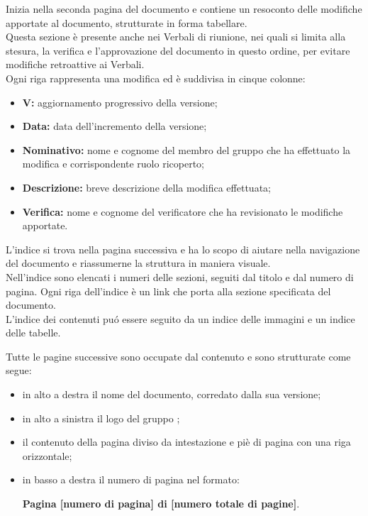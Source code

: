         Inizia nella seconda pagina del documento e contiene un resoconto delle modifiche apportate al documento, strutturate in forma tabellare.\\
        Questa sezione è presente anche nei Verbali di riunione, nei quali si limita alla stesura, la verifica e l'approvazione del documento in questo ordine, per evitare modifiche retroattive ai Verbali.\\
        Ogni riga rappresenta una modifica ed è suddivisa in cinque colonne:
        \begin{itemize}
          \item \textbf{V:} aggiornamento progressivo della versione;
          \item \textbf{Data:} data dell'incremento della versione;
          \item \textbf{Nominativo:} nome e cognome del membro del gruppo che ha effettuato la modifica e corrispondente ruolo ricoperto;
          \item \textbf{Descrizione:} breve descrizione della modifica effettuata;
          \item \textbf{Verifica:} nome e cognome del verificatore che ha revisionato le modifiche apportate.
        \end{itemize}

        L'indice si trova nella pagina successiva e ha lo scopo di aiutare nella navigazione del documento e riassumerne la struttura in maniera visuale.\\
        Nell'indice sono elencati i numeri delle sezioni, seguiti dal titolo e dal numero di pagina. Ogni riga dell'indice è un link che porta alla sezione specificata del documento.\\
        L'indice dei contenuti puó essere seguito da un indice delle immagini e un indice delle tabelle.

        Tutte le pagine successive sono occupate dal contenuto e sono strutturate come segue:
        \begin{itemize}
          \item in alto a destra il nome del documento, corredato dalla sua versione;
          \item in alto a sinistra il logo del gruppo \Gruppo{};
          \item il contenuto della pagina diviso da intestazione e piè di pagina con una riga orizzontale;
          \item in basso a destra il numero di pagina nel formato:
          \begin{center}
            \textbf{Pagina [numero di pagina] di [numero totale di pagine]}.
          \end{center}
        \end{itemize}

